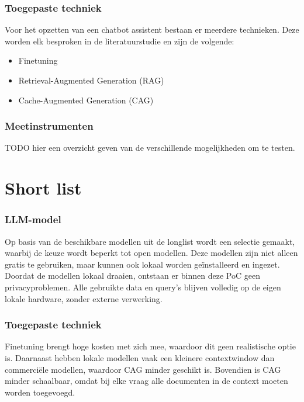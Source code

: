\subsubsection{Toegepaste techniek}

Voor het opzetten van een chatbot assistent bestaan er meerdere technieken. Deze worden elk besproken in de literatuurstudie en zijn de volgende:
\begin{itemize}
    \item Finetuning
    \item Retrieval-Augmented Generation (RAG)
    \item Cache-Augmented Generation (CAG)
\end{itemize}

\subsubsection{Meetinstrumenten}
TODO hier een overzicht geven van de verschillende mogelijkheden om te testen. 

\section{Short list}

\subsubsection{LLM-model}

Op basis van de beschikbare modellen uit de longlist wordt een selectie gemaakt, waarbij de keuze wordt beperkt tot open modellen. Deze modellen zijn niet alleen gratis te gebruiken, maar kunnen ook lokaal worden geïnstalleerd en ingezet. Doordat de modellen lokaal draaien, ontstaan er binnen deze PoC geen privacyproblemen. Alle gebruikte data en query’s blijven volledig op de eigen lokale hardware, zonder externe verwerking.

\subsubsection{Toegepaste techniek}

Finetuning brengt hoge kosten met zich mee, waardoor dit geen realistische optie is. Daarnaast hebben lokale modellen vaak een kleinere contextwindow dan commerciële modellen, waardoor CAG minder geschikt is. Bovendien is CAG minder schaalbaar, omdat bij elke vraag alle documenten in de context moeten worden toegevoegd.


